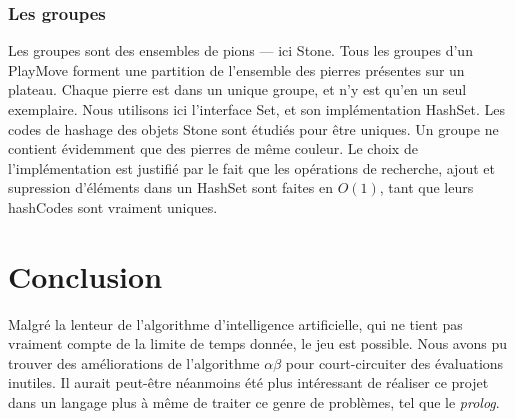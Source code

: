 \documentclass[11pt,a4paper,titlepage,french]{article}
\begin{document}
			\subsubsection{Les groupes}\label{groupes}

				Les groupes sont des ensembles de pions --- ici Stone. Tous les groupes d'un PlayMove forment une partition de l'ensemble des pierres présentes sur un plateau. Chaque pierre est dans un unique groupe, et n'y est qu'en un seul exemplaire. Nous utilisons ici l'interface Set, et son implémentation HashSet. Les codes de hashage des objets Stone sont étudiés pour être uniques. Un groupe ne contient évidemment que des pierres de même couleur. Le choix de l'implémentation est justifié par le fait que les opérations de recherche, ajout et supression d'éléments dans un HashSet sont faites en $O(1)$, tant que leurs hashCodes sont vraiment uniques.

	\section*{Conclusion}

		Malgré la lenteur de l'algorithme d'intelligence artificielle, qui ne tient pas vraiment compte de la limite de temps donnée, le jeu est possible. Nous avons pu trouver des améliorations de l'algorithme $\alpha\beta$ pour court-circuiter des évaluations inutiles. Il aurait peut-être néanmoins été plus intéressant de réaliser ce projet dans un langage plus à même de traiter ce genre de problèmes, tel que le \emph{prolog}.
\end{document}
